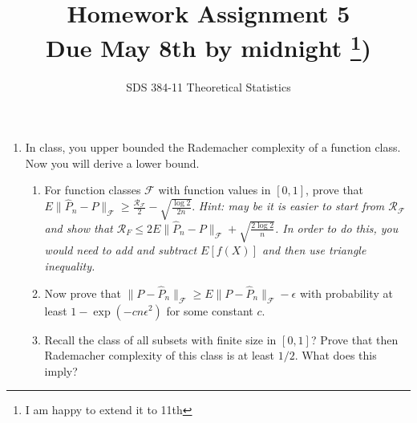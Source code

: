 \documentclass[11pt]{article}
\newcommand{\F}{\mathcal{F}}
\newcommand{\R}{\mathcal{R}}
\begin{document}
\title{{\bf Homework Assignment 5}\\Due  May 8th by  midnight \footnote{I am happy to extend it to 11th})}
\author{SDS 384-11 Theoretical Statistics}

\date{}

\maketitle{}
\begin{enumerate}%


\item In class, you upper bounded the Rademacher complexity of a function class. Now you will derive a lower bound.
\begin{enumerate}
	\item For function classes $\F$ with function values in $[0,1]$, prove that $E\|\hat{P}_n-P\|_\F\geq \frac{\R_\F}{2}-\sqrt{\frac{\log 2}{2n}}$.
	\textit{Hint: may be it is easier to start from $\R_\F$ and show that $\R_F\leq 2E\|\hat{P}_n-P\|_\F+\sqrt{\frac{2\log 2}{n}}$. In order to do this, you would need to add and subtract $E[f(X)]$ and then use triangle inequality.}
	\item Now prove that $\|P-\hat{P}_n\|_\F\geq E\|P-\hat{P}_n\|_\F-\epsilon$ with probability at least $1-\exp(-cn\epsilon^2)$ for some constant $c$.
	\item Recall the class of all subsets with finite size in $[0,1]$? Prove that then Rademacher complexity of this class is at least $1/2$. What does this imply?
\end{enumerate}


\end{enumerate}
\end{document}
